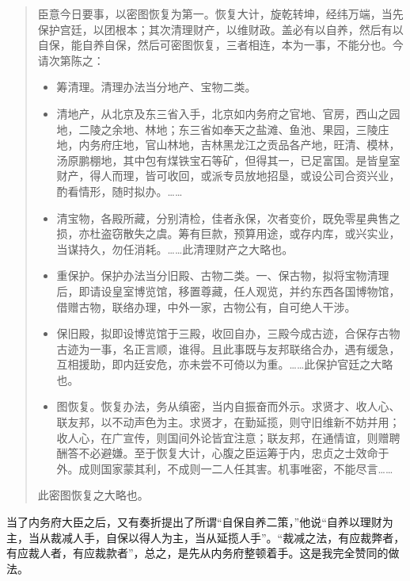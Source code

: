 \begin{quote}
	臣意今日要事，以密图恢复为第一。恢复大计，旋乾转坤，经纬万端，当先保护宫廷，以团根本；其次清理财产，以维财政。盖必有以自养，然后有以自保，能自养自保，然后可密图恢复，三者相连，本为一事，不能分也。今请次第陈之：\\

	\begin{itemize}
		\item 筹清理。清理办法当分地产、宝物二类。\\
		\item 清地产，从北京及东三省入手，北京如内务府之官地、官房，西山之园地，二陵之余地、林地；东三省如奉天之盐滩、鱼池、果园，三陵庄地，内务府庄地，官山林地，吉林黑龙江之贡品各产地，旺清、模林，汤原鹏棚地，其中包有煤铁宝石等矿，但得其一，已足富国。是皆皇室财产，得人而理，皆可收回，或派专员放地招垦，或设公司合资兴业，酌看情形，随时拟办。……\\
		\item 清宝物，各殿所藏，分别清检，佳者永保，次者变价，既免零星典售之损，亦杜盗窃散失之虞。筹有巨款，预算用途，或存内库，或兴实业，当谋持久，勿任消耗。……此清理财产之大略也。\\
		\item 重保护。保护办法当分旧殿、古物二类。一、保古物，拟将宝物清理后，即请设皇室博览馆，移置尊藏，任人观览，并约东西各国博物馆，借赠古物，联络办理，中外一家，古物公有，自可绝人干涉。\\
		\item 保旧殿，拟即设博览馆于三殿，收回自办，三殿今成古迹，合保存古物古迹为一事，名正言顺，谁得。且此事既与友邦联络合办，遇有缓急，互相援助，即内廷安危，亦未尝不可倚以为重。……此保护官廷之大略也。\\
		\item 图恢复。恢复办法，务从缜密，当内自振奋而外示。求贤才、收人心、联友邦，以不动声色为主。求贤才，在勤延揽，则守旧维新不妨并用；收人心，在广宣传，则国间外论皆宜注意；联友邦，在通情谊，则赠聘酬答不必避嫌。至于恢复大计，心腹之臣运筹于内，忠贞之士效命于外。成则国家蒙其利，不成则一二人任其害。机事唯密，不能尽言……\\
	\end{itemize}

此密图恢复之大略也。\\
\end{quote}

当了内务府大臣之后，又有奏折提出了所谓“自保自养二策，”他说“自养以理财为主，当从裁减人手，自保以得人为主，当从延揽人手”。“裁减之法，有应裁弊者，有应裁人者，有应裁款者”，总之，是先从内务府整顿着手。这是我完全赞同的做法。\\

